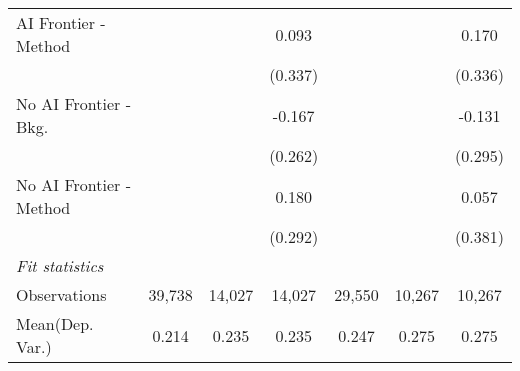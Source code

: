 \begin{tabular}{lcccccc}
   AI Frontier - Method    &               &               & 0.093        &               &               & 0.170\\   
                           &               &               & (0.337)      &               &               & (0.336)\\   
   No AI Frontier - Bkg.   &               &               & -0.167       &               &               & -0.131\\   
                           &               &               & (0.262)      &               &               & (0.295)\\   
   No AI Frontier - Method &               &               & 0.180        &               &               & 0.057\\   
                           &               &               & (0.292)      &               &               & (0.381)\\   
   \midrule
   \emph{Fit statistics}\\
   Observations            & 39,738        & 14,027        & 14,027       & 29,550        & 10,267        & 10,267\\  
Mean(Dep. Var.) & 0.214 & 0.235 & 0.235 & 0.247 & 0.275 & 0.275 \\
   

\end{tabular}
